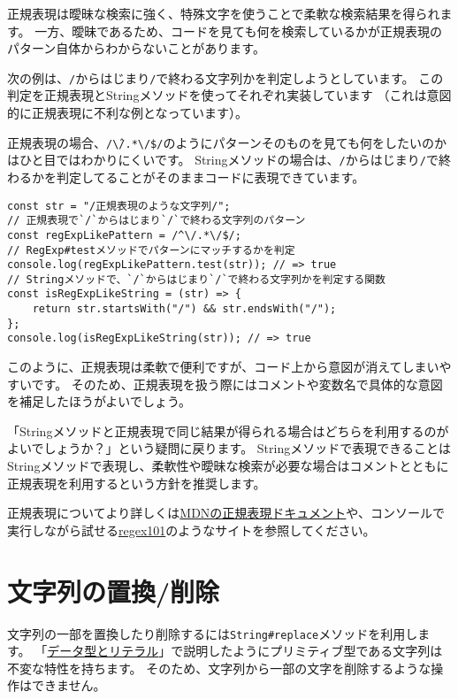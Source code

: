 正規表現は曖昧な検索に強く、特殊文字を使うことで柔軟な検索結果を得られます。
一方、曖昧であるため、コードを見ても何を検索しているかが正規表現のパターン自体からわからないことがあります。

次の例は、\texttt{/}からはじまり\texttt{/}で終わる文字列かを判定しようとしています。
この判定を正規表現とStringメソッドを使ってそれぞれ実装しています
（これは意図的に正規表現に不利な例となっています）。

正規表現の場合、\texttt{/\^\textbackslash/.*\textbackslash/\$/}のようにパターンそのものを見ても何をしたいのかはひと目ではわかりにくいです。
Stringメソッドの場合は、\texttt{/}からはじまり\texttt{/}で終わるかを判定してることがそのままコードに表現できています。

\begin{lstlisting}
const str = "/正規表現のような文字列/";
// 正規表現で`/`からはじまり`/`で終わる文字列のパターン
const regExpLikePattern = /^\/.*\/$/;
// RegExp#testメソッドでパターンにマッチするかを判定
console.log(regExpLikePattern.test(str)); // => true
// Stringメソッドで、`/`からはじまり`/`で終わる文字列かを判定する関数
const isRegExpLikeString = (str) => {
    return str.startsWith("/") && str.endsWith("/");
};
console.log(isRegExpLikeString(str)); // => true
\end{lstlisting}

このように、正規表現は柔軟で便利ですが、コード上から意図が消えてしまいやすいです。
そのため、正規表現を扱う際にはコメントや変数名で具体的な意図を補足したほうがよいでしょう。

「Stringメソッドと正規表現で同じ結果が得られる場合はどちらを利用するのがよいでしょうか？」という疑問に戻ります。
Stringメソッドで表現できることはStringメソッドで表現し、柔軟性や曖昧な検索が必要な場合はコメントとともに正規表現を利用するという方針を推奨します。

正規表現についてより詳しくは\href{https://developer.mozilla.org/ja/docs/Web/JavaScript/Guide/Regular_Expressions}{MDNの正規表現ドキュメント}や、コンソールで実行しながら試せる\href{https://regex101.com/}{regex101}のようなサイトを参照してください。

\hypertarget{replace-delete}{%
\section{文字列の置換/削除}\label{replace-delete}}

文字列の一部を置換したり削除するには\texttt{String\#replace}メソッドを利用します。
「\href{../data-type/README.md}{データ型とリテラル}」で説明したようにプリミティブ型である文字列は不変な特性を持ちます。
そのため、文字列から一部の文字を削除するような操作はできません。

